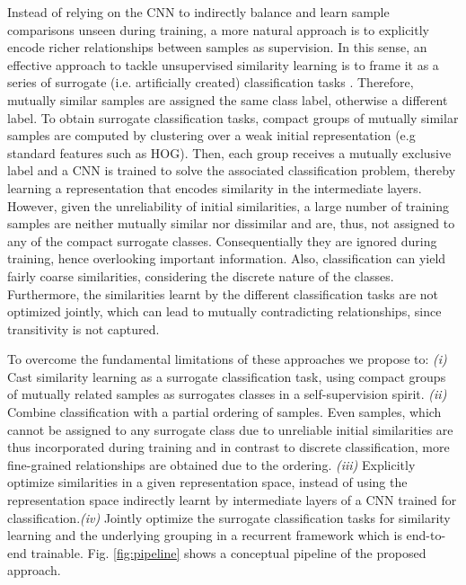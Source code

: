 \documentclass[10pt,twocolumn,letterpaper]{article}
\begin{document}
Instead of relying on the CNN to indirectly balance and learn sample comparisons unseen during training, a more natural approach is to explicitly encode richer relationships between samples as supervision. In this sense, an effective approach to tackle unsupervised similarity learning is to frame it as a series of surrogate (i.e. artificially created) classification tasks \cite{exemplarcnn,cliquecnn}. Therefore, mutually similar samples are assigned the same class label, otherwise a different label. To obtain surrogate classification tasks, compact groups of mutually similar samples are computed by clustering \cite{cliquecnn} over a weak initial representation (e.g standard features such as HOG). Then, each group receives a mutually exclusive label and a CNN is trained to solve the associated classification problem, thereby learning a representation that encodes similarity in the intermediate layers. However, given the unreliability of initial similarities, a large number of training samples are neither mutually similar nor dissimilar and are, thus, not assigned to any of the compact surrogate classes. Consequentially they are ignored during training, hence overlooking important information. Also, classification can yield fairly coarse similarities, considering the discrete nature of the classes. Furthermore, the similarities learnt by the different classification tasks are not optimized jointly, which can lead to mutually contradicting relationships, since transitivity is not captured.


To overcome the fundamental limitations of these approaches we propose to: \emph{(i)} Cast similarity learning as a surrogate classification task, using compact groups of mutually related samples as surrogates classes in a self-supervision spirit. \emph{(ii)} Combine classification with a partial ordering of samples. Even samples, which cannot be assigned to any surrogate class due to unreliable initial similarities are thus incorporated during training and in contrast to discrete classification, more fine-grained relationships are obtained due to the ordering. \emph{(iii)} Explicitly optimize similarities in a given representation space, instead of using the representation space indirectly learnt by intermediate layers of a CNN trained for classification.\emph{(iv)} Jointly optimize the surrogate classification tasks for similarity learning and the underlying grouping in a recurrent framework which is end-to-end trainable. Fig. \ref{fig:pipeline} shows a conceptual pipeline of the proposed approach.
\end{document}
